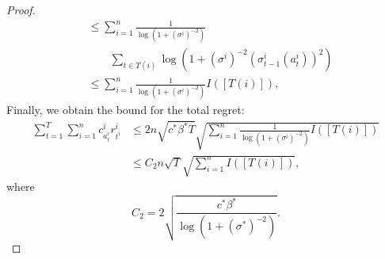 \documentclass[letterpaper]{vldb}
\begin{document}
\begin{proof}
\begin{align*}
    & \le \sum_{i=1}^n \frac{1}{\log\left(1 + (\sigma^i)^{-2}\right)}\\
    &\qquad \sum_{t\in T(i)} \log\left(1 + (\sigma^i)^{-2} (\sigma^i_{t-1}(a^i_{t}))^2\right)\\
    & \le \sum_{i=1}^n \frac{1}{\log\left(1 + (\sigma^i)^{-2}\right)} I([T(i)]),
  \end{align*}
  Finally, we obtain the bound for the total regret:
  \begin{align*}
    \sum_{t=1}^T \sum_{i=1}^n c^i_{a^i_t} r^i_{t^i}
    & \le 2n \sqrt{c^\ast \beta^\ast T} \sqrt{\sum_{i=1}^n \frac{1}{\log\left(1 + (\sigma^i)^{-2}\right)} I([T(i)])}\\
    & \le C_2 n \sqrt{T} \sqrt{\sum_{i=1}^n I([T(i)])},
  \end{align*}
  where
  \[
    C_2 = 2 \sqrt{\frac{c^\ast \beta^\ast}{\log(1 + (\sigma^\ast)^{-2})}}.
  \]
\end{proof}
\end{document}
